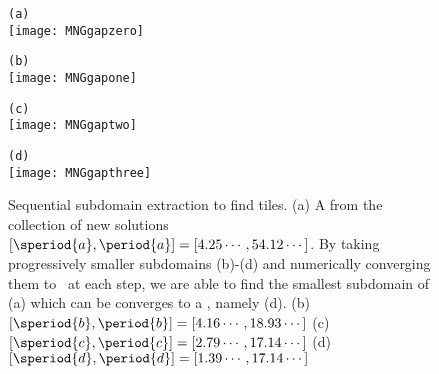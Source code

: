\begin{figure}
\begin{minipage}[height=.2\textheight]{.5\textwidth}
\centering \small{\texttt{(a)}}\\
\texttt{[image: MNGgapzero]}
\end{minipage}
\begin{minipage}[height=.2\textheight]{.5\textwidth}
\centering \small{\texttt{(b)}}\\
\texttt{[image: MNGgapone]}
\end{minipage}
\begin{minipage}[height=.2\textheight]{.5\textwidth}
\centering \small{\texttt{(c)}}\\
\texttt{[image: MNGgaptwo]}
\end{minipage}
\begin{minipage}[height=.2\textheight]{.48\textwidth}
\centering \small{\texttt{(d)}}\\
\texttt{[image: MNGgapthree]}
\end{minipage}
\caption{ \label{fig:KStileextraction}
Sequential subdomain extraction to find tiles.
(a) A {\po} from the collection of new solutions
$[\speriod{a},\period{a}]=[4.25\cdots,54.12\cdots]$.
By taking progressively smaller subdomains (b)-(d) and numerically
converging them to \twots\ at each step, we are able to
find the smallest subdomain of (a) which can be converges
to a \twot, namely (d).
(b)$[\speriod{b},\period{b}]=[4.16\cdots,18.93\cdots]$
(c)$[\speriod{c},\period{c}]=[2.79\cdots,17.14\cdots]$
(d)$[\speriod{d},\period{d}]=[1.39\cdots,17.14\cdots]$
}
\end{figure}


